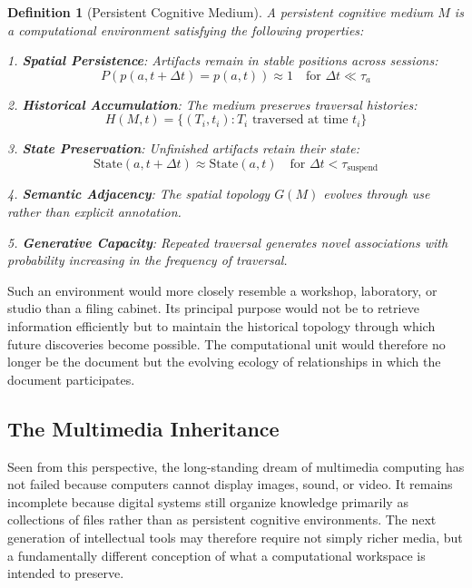 \documentclass[12pt,oneside]{article}
\newtheorem{definition}{Definition}[section]
\theoremstyle{remark}
\begin{document}
\begin{definition}[Persistent Cognitive Medium]
A persistent cognitive medium $M$ is a computational environment satisfying the following properties:

1. \textbf{Spatial Persistence}: Artifacts remain in stable positions across sessions:
   \begin{equation}
   P(p(a, t + \Delta t) = p(a, t)) \approx 1 \quad \text{for } \Delta t \ll \tau_a
   \end{equation}

2. \textbf{Historical Accumulation}: The medium preserves traversal histories:
   \begin{equation}
   H(M, t) = \{(T_i, t_i) : T_i \text{ traversed at time } t_i\}
   \end{equation}

3. \textbf{State Preservation}: Unfinished artifacts retain their state:
   \begin{equation}
   \text{State}(a, t + \Delta t) \approx \text{State}(a, t) \quad \text{for } \Delta t < \tau_{\text{suspend}}
   \end{equation}

4. \textbf{Semantic Adjacency}: The spatial topology $G(M)$ evolves through use rather than explicit annotation.

5. \textbf{Generative Capacity}: Repeated traversal generates novel associations with probability increasing in the frequency of traversal.
\end{definition}

Such an environment would more closely resemble a workshop, laboratory, or studio than a filing cabinet. Its principal purpose would not be to retrieve information efficiently but to maintain the historical topology through which future discoveries become possible. The computational unit would therefore no longer be the document but the evolving ecology of relationships in which the document participates.

\subsection{The Multimedia Inheritance}

Seen from this perspective, the long-standing dream of multimedia computing has not failed because computers cannot display images, sound, or video. It remains incomplete because digital systems still organize knowledge primarily as collections of files rather than as persistent cognitive environments. The next generation of intellectual tools may therefore require not simply richer media, but a fundamentally different conception of what a computational workspace is intended to preserve.
\end{document}
